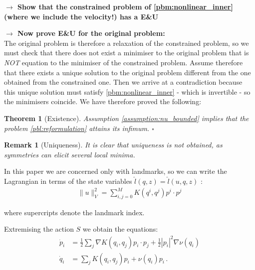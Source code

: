 \documentclass{article}
\newtheorem{theorem}{Theorem}
\newtheorem{remark}{Remark}
\newcommand{\norm}[2]{\| #1 \|_{ #2 }}
\newcommand{\vnorm}[1]{\norm{ #1 }{V}}
\newcommand{\RdM}{\mathbb{R}^{d\times M}}
\begin{document}
\textbf{$\longrightarrow$ Show that the constrained problem of
\eqref{pbm:nonlinear_inner} (where we include the velocity!) has a E\&U}

\textbf{$\longrightarrow$ Now prove E\&U for the original problem:}\\

The original problem is therefore a relaxation of the constrained problem, so we
must check that there does not exist a minimiser to the original problem that is
\emph{NOT} equation to the minimiser of the constrained problem. Assume
therefore that there exists a unique solution to the original problem different
from the one obtained from the constrained one. Then we arrive at a
contradiction because this unique solution must satisfy
\eqref{pbm:nonlinear_inner} - which is invertible - so the minimisers coincide.
We have therefore proved the following:

\begin{theorem}[Existence]
Assumption \ref{assumption:nu_bounded} implies that the problem
\eqref{pbl:reformulation} attains its infimum.
{\hfill $\square$}
\end{theorem}

\begin{remark}[Uniqueness]
It is clear that uniqueness is not obtained, as symmetries can elicit several
local minima.
\end{remark}

In this paper we are concerned only with
landmarks, so we can write the Lagrangian in terms of the state variables $\hat
l(q, z) = \hat l(u, q, z)$ \cite{younes2010shapes}:
\begin{align*}
\vnorm{u}^2 = \sum_{i,j=0}^M K(q^i,q^j) p^i \cdot p^j
\end{align*}

where supercripts denote the landmark index. 

Extremising the action $S$ we obtain the equations: 
\begin{align}\label{pq:optimality}
\dot p_i & =\frac12 \sum_j \nabla K(q_i,q_j)p_i\cdot p_j  + \frac12 |p_i|^2 \nabla \nu(q_i)\\
\dot q_i & = \sum_j K(q_i,q_j)p_i + \nu(q_i)p_i\, . 
\end{align}
\end{document}
